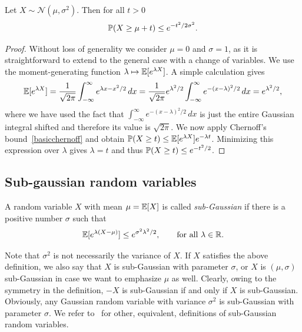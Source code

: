 \begin{proposition} \label{prop:gaussian}
Let $X \sim {\mathcal N}(\mu,\sigma^2)$. Then for all $t>0$
\begin{equation}\label{gaussiantail}
 \P (X \ge \mu + t) \le e^{-t^2/2\sigma^2}.
\end{equation}
\end{proposition}


\begin{proof}
Without loss of generality we consider $\mu=0$ and $\sigma=1$, as it is straightforward to extend to the general case with a change of variables. We use the moment-generating function $\lambda \mapsto \E[e^{\lambda X}]$. A simple calculation gives
\begin{equation*}%
\E[e^{\lambda X}] =   \frac{1}{\sqrt{2 \pi}} \int_{-\infty}^{\infty} e^{ \lambda x- x^2/2} \, dx =
\frac{1}{\sqrt{2 \pi}}   e^{  \lambda^2/2} \int_{-\infty}^{\infty} e^{ -(x- \lambda)^2/2} \, dx = e^{ \lambda^2/2},
\end{equation*}
where we have used the fact that $ \int_{-\infty}^{\infty} e^{ -(x- \lambda)^2/2} \, dx$  is just the entire Gaussian integral shifted and therefore its value is $\sqrt{2\pi}$.
We now apply  Chernoff's bound~\eqref{basicchernoff} and obtain $\P(X \geq t) \le \E[e^{\lambda X}]  e^{-\lambda t}$. Minimizing this expression over $\lambda$ gives $\lambda=t$ and thus $\P (X \geq t) \le e^{-t^2/2}$.
\end{proof}

\subsection{Sub-gaussian random variables}

\begin{definition}\label{def:subgaussian}
A random variable $X$ with mean $\mu = \E[X]$  is called {\em sub-Gaussian} if there is a positive number $\sigma$ such that
$$\E[e^{\lambda(X-\mu)}] \le e^{\sigma^2 \lambda^2/2}, \qquad \text{for all $\lambda \in \R$.}$$
\end{definition}
Note that $\sigma^2$ is not necessarily the variance of $X$. If $X$ satisfies the above definition, we also say that $X$ is sub-Gaussian with parameter $\sigma$, or $X$ is $(\mu,\sigma)$ sub-Gaussian in case we want to emphasize $\mu$ as well. Clearly, owing to the symmetry in the definition, $-X$ is sub-Gaussian if and only if $X$ is sub-Gaussian.
Obviously, any Gaussian random variable with variance $\sigma^2$ is sub-Gaussian with parameter $\sigma$.
We refer to~\cite{vershynin2018} for other, equivalent, definitions of sub-Gaussian random variables.

